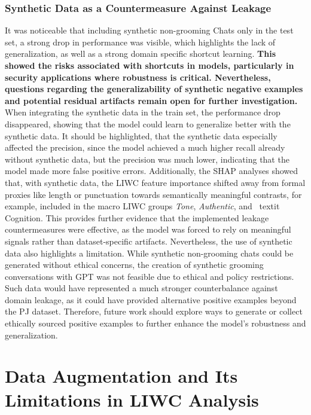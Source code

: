 \subsubsection{Synthetic Data as a Countermeasure Against Leakage}
It was noticeable that including synthetic non-grooming Chats only in the test set, a strong drop in performance was visible, which highlights the lack of generalization, as well as a strong domain specific shortcut learning. \textbf{This showed the risks associated with shortcuts in models, particularly in security applications where robustness is critical. Nevertheless, questions regarding the generalizability of synthetic negative examples and potential residual artifacts remain open for further investigation.} When integrating the synthetic data in the train set, the performance drop disappeared, showing that the model could learn to generalize better with the synthetic data. It should be highlighted, that the synthetic data especially affected the precision, since the model achieved a much higher recall already without synthetic data, but the precision was much lower, indicating that the model made more false positive errors. Additionally, the SHAP analyses showed that, with synthetic data, the LIWC feature importance shifted away from formal proxies like length or punctuation towards semantically meaningful contrasts, for example, included in the macro LIWC groups \textit{Tone}, \textit{Authentic}, and \ textit {Cognition}. This provides further evidence that the implemented leakage countermeasures were effective, as the model was forced to rely on meaningful signals rather than dataset-specific artifacts. Nevertheless, the use of synthetic data also highlights a limitation. While synthetic non-grooming chats could be generated without ethical concerns, the creation of synthetic grooming conversations with GPT was not feasible due to ethical and policy restrictions. Such data would have represented a much stronger counterbalance against domain leakage, as it could have provided alternative positive examples beyond the PJ dataset. Therefore, future work should explore ways to generate or collect ethically sourced positive examples to further enhance the model's robustness and generalization.
\section{Data Augmentation and Its Limitations in LIWC Analysis}

